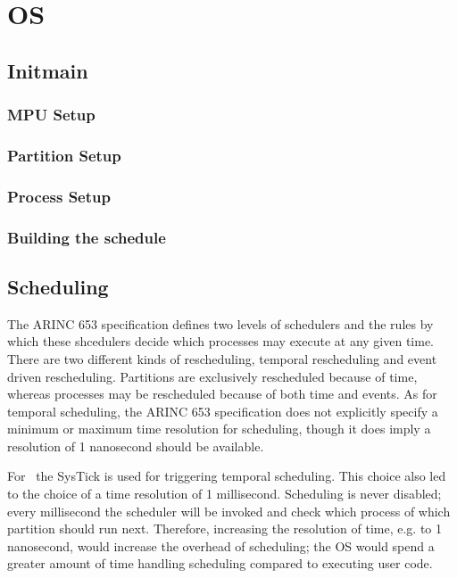 \section{OS}

\subsection{Init\/main}

\subsubsection{MPU Setup}
\subsubsection{Partition Setup}
\subsubsection{Process Setup}
\subsubsection{Building the schedule}
\label{sssec:build_schedule}


\subsection{Scheduling}
The ARINC 653 specification defines two levels of schedulers and the rules by
which these shcedulers decide which processes may execute at any given time.
There are two different kinds of rescheduling, temporal rescheduling and event
driven rescheduling. Partitions are exclusively rescheduled because of time, 
whereas processes may be rescheduled because of both time and events.
As for temporal scheduling, the ARINC 653 specification does not explicitly 
specify a minimum or maximum time resolution for scheduling, though it does
imply a resolution of 1 nanosecond should be available\cite{arinc_time_resolution}.

For \OSname\ the SysTick is used for triggering temporal scheduling. This choice
also led to the choice of a time resolution of 1 millisecond. Scheduling is
never disabled; every millisecond the scheduler will be invoked and check which
process of which partition should run next. Therefore, increasing the resolution
of time, e.g. to 1 nanosecond, would increase the overhead of scheduling; the OS
would spend a greater amount of time handling scheduling compared to executing
user code.

